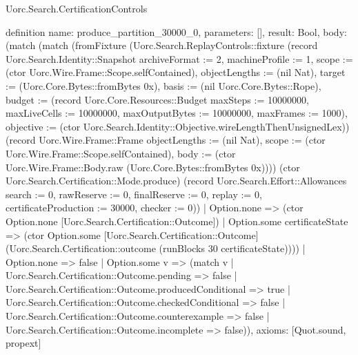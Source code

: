 \begin{lexlean}{Uorc.Search.CertificationControls}
\begin{semanticmodule}
definition{
  name: produce_partition_30000_0,
  parameters: [],
  result: Bool,
  body: (match (match (fromFixture (Uorc.Search.ReplayControls::fixture (record Uorc.Search.Identity::Snapshot {archiveFormat := 2, machineProfile := 1, scope := (ctor Uorc.Wire.Frame::Scope.selfContained), objectLengths := (nil Nat), target := (Uorc.Core.Bytes::fromBytes 0x), basis := (nil Uorc.Core.Bytes::Rope), budget := (record Uorc.Core.Resources::Budget {maxSteps := 10000000, maxLiveCells := 10000000, maxOutputBytes := 10000000, maxFrames := 1000}), objective := (ctor Uorc.Search.Identity::Objective.wireLengthThenUnsignedLex)}) (record Uorc.Wire.Frame::Frame {objectLengths := (nil Nat), scope := (ctor Uorc.Wire.Frame::Scope.selfContained), body := (ctor Uorc.Wire.Frame::Body.raw (Uorc.Core.Bytes::fromBytes 0x))})) (ctor Uorc.Search.Certification::Mode.produce) (record Uorc.Search.Effort::Allowances {search := 0, rawReserve := 0, finalReserve := 0, replay := 0, certificateProduction := 30000, checker := 0}))
      | Option.none => (ctor Option.none [Uorc.Search.Certification::Outcome])
      | Option.some certificateState => (ctor Option.some [Uorc.Search.Certification::Outcome] (Uorc.Search.Certification::outcome (runBlocks 30 certificateState))))
    | Option.none => false
    | Option.some v => (match v
      | Uorc.Search.Certification::Outcome.pending => false
      | Uorc.Search.Certification::Outcome.producedConditional => true
      | Uorc.Search.Certification::Outcome.checkedConditional => false
      | Uorc.Search.Certification::Outcome.counterexample => false
      | Uorc.Search.Certification::Outcome.incomplete => false)),
  axioms: [Quot.sound, propext]
}


\end{semanticmodule}
\end{lexlean}
